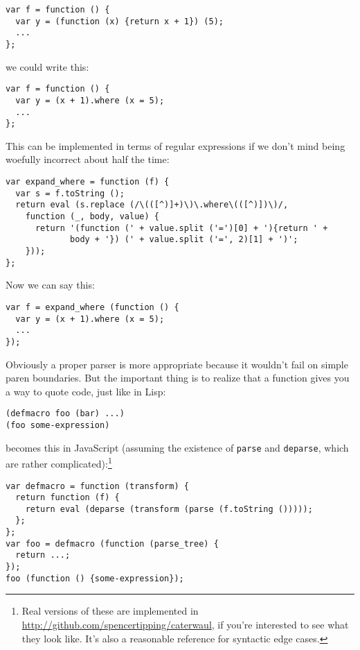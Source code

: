 \documentclass{article}
\begin{document}
\begin{verbatim}
var f = function () {
  var y = (function (x) {return x + 1}) (5);
  ...
};
\end{verbatim}

    \noindent we could write this:

\begin{verbatim}
var f = function () {
  var y = (x + 1).where (x = 5);
  ...
};
\end{verbatim}

    This can be implemented in terms of regular expressions if we don't mind being woefully incorrect about half the time:

\begin{verbatim}
var expand_where = function (f) {
  var s = f.toString ();
  return eval (s.replace (/\(([^)]+)\)\.where\(([^)])\)/,
    function (_, body, value) {
      return '(function (' + value.split ('=')[0] + '){return ' +
             body + '}) (' + value.split ('=', 2)[1] + ')';
    }));
};
\end{verbatim}

    Now we can say this:

\begin{verbatim}
var f = expand_where (function () {
  var y = (x + 1).where (x = 5);
  ...
});
\end{verbatim}

    Obviously a proper parser is more appropriate because it wouldn't fail on simple paren boundaries. But the important thing is to realize that a function gives you a way to quote code, just
    like in Lisp:

\begin{verbatim}
(defmacro foo (bar) ...)
(foo some-expression)
\end{verbatim}

    \noindent becomes this in JavaScript (assuming the existence of \verb|parse| and \verb|deparse|, which are rather complicated):\footnote{Real versions of these are implemented in
    \url{http://github.com/spencertipping/caterwaul}, if you're interested to see what they look like. It's also a reasonable reference for syntactic edge cases.}

\begin{verbatim}
var defmacro = function (transform) {
  return function (f) {
    return eval (deparse (transform (parse (f.toString ()))));
  };
};
var foo = defmacro (function (parse_tree) {
  return ...;
});
foo (function () {some-expression});
\end{verbatim}
\end{document}
